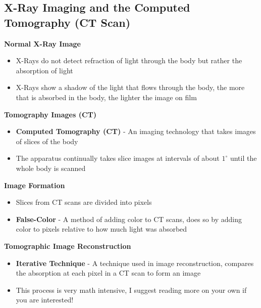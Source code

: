 \subsection{X-Ray Imaging and the Computed Tomography (CT Scan)}
\textbf{Normal X-Ray Image}
\begin{itemize}
    \item X-Rays do not detect refraction of light through the body but rather the absorption of light
    \item X-Rays show a shadow of the light that flows through the body, the more that is absorbed in the body, the lighter the image on film
\end{itemize}

\textbf{Tomography Images (CT)}
\begin{itemize}
    \item \textbf{Computed Tomography (CT)} - An imaging technology that takes images of slices of the body
    \item The apparatus continually takes slice images at intervals of about \(1^\circ\) until the whole body is scanned
\end{itemize}

\textbf{Image Formation}
\begin{itemize}
    \item Slices from CT scans are divided into pixels
    \item \textbf{False-Color} - A method of adding color to CT scans, does so by adding color to pixels relative to how much light was absorbed
\end{itemize}

\textbf{Tomographic Image Reconstruction}
\begin{itemize}
    \item \textbf{Iterative Technique} - A technique used in image reconstruction, compares the absorption at each pixel in a CT scan to form an image
    \item This process is very math intensive, I suggest reading more on your own if you are interested!
\end{itemize}

\newpage